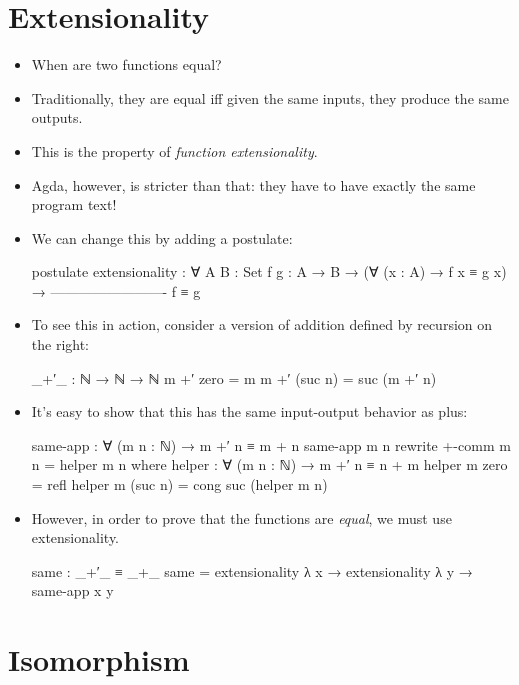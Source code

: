 \documentclass{lecturenotes}
\begin{document}
\section{Extensionality}
\label{sec:extensionality}

\begin{itemize}
\item When are two functions equal?
\item Traditionally, they are equal iff given the same inputs, they produce the same outputs.
\item This is the property of \emph{function extensionality}.
\item Agda, however, is stricter than that: they have to have exactly the same program text!
\item We can change this by adding a postulate:
\begin{code}
postulate
  extensionality : ∀ {A B : Set} {f g : A → B} →
                   (∀ (x : A) → f x ≡ g x) →
                   -------------------------
                              f ≡ g

\end{code}
\item To see this in action, consider a version of addition defined by recursion on the right:
\begin{code}
_+′_ : ℕ → ℕ → ℕ
m +′ zero = m
m +′ (suc n) = suc (m +′ n)
\end{code}
\item It's easy to show that this has the same input-output behavior as plus:
\begin{code}
same-app : ∀ (m n : ℕ) → m +′ n ≡ m + n
same-app m n rewrite +-comm m n = helper m n
  where
  helper : ∀ (m n : ℕ) → m +′ n ≡ n + m
  helper m zero = refl
  helper m (suc n) = cong suc (helper m n)
\end{code}
\item However, in order to prove that the functions are \emph{equal}, we must use extensionality.
\begin{code}
same : _+′_ ≡ _+_
same = extensionality λ x → extensionality λ y → same-app x y
\end{code}
\end{itemize}

\section{Isomorphism}
\label{sec:isomorphism}
\end{document}
